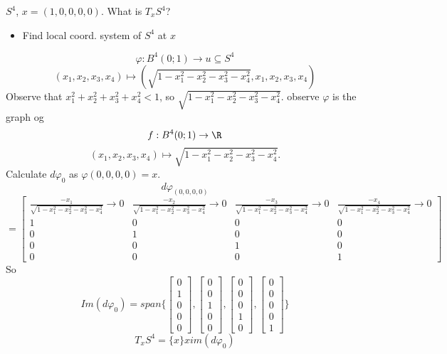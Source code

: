 \begin{example}
  $S^4$, $x=(1,0,0,0,0)$.
  \newline What is $T_xS^4$?
  \begin{itemize}
    \item Find local coord. system of $S^4$ at $x$
  \end{itemize}
    $$
      \varphi : B^4(0;1) \longrightarrow u\subseteq S^4
    $$
    $$
      (x_1,x_2,x_3,x_4) \longmapsto \left(\sqrt{1-x_1^2-x_2^2-x_3^2-x_4^2},x_1,x_2,x_3,x_4\right)
    $$
    Observe that $x_1^2+x_2^2+x_3^2+x_4^2<1$, so $\sqrt{1-x_1^2-x_2^2-x_3^2-x_4^2}$.
    \newline observe $\varphi $ is the graph og
      $$f:B^4(0;1)\to \R$$
      $$(x_1,x_2,x_3,x_4)\mapsto \sqrt{1-x_1^2-x_2^2-x_3^2-x_4^2}.$$
      Calculate $d \varphi _0$ as $\varphi (0,0,0,0)=x$.
    $$d \varphi_{(0,0,0,0)}$$
$$
     =
\begin{bmatrix}
    \frac{-x_1}{\sqrt{1-x_1^2-x_2^2-x_3^2-x_4^2}}\to 0  & \frac{-x_2}{\sqrt{1-x_1^2-x_2^2-x_3^2-x_4^2}}\to 0 & \frac{-x_3}{\sqrt{1-x_1^2-x_2^2-x_3^2-x_4^2}}\to 0 & \frac{-x_4}{\sqrt{1-x_1^2-x_2^2-x_3^2-x_4^2}} \to 0  \\
    1 & 0 & 0 & 0 \\
    0 & 1 & 0 & 0 \\
    0 & 0 & 1 & 0 \\
    0 & 0 & 0 & 1
\end{bmatrix}
    $$
  So
  $$
  Im(d \varphi _0)=span\{
\begin{bmatrix}
  0\\
  1\\
  0\\
  0\\
  0
\end{bmatrix},
\begin{bmatrix}
  0\\
  0\\
  1\\
  0\\
  0
\end{bmatrix},
\begin{bmatrix}
  0\\
  0\\
  0\\
  1\\
  0
\end{bmatrix},
\begin{bmatrix}
  0\\
  0\\
  0\\
  0\\
  1
\end{bmatrix}
  \}
  $$
  $$T_xS^4=\{x\}x im (d \varphi _0)$$
\end{example}

